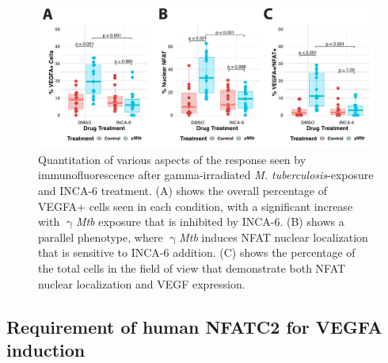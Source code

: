 \begin{figure}
\centering
\includegraphics[width=\textwidth]{images/incaIFquant.pdf}
\caption{Quantitation of various aspects of the response seen by immunofluorescence after gamma-irradiated \textit{M. tuberculosis}-exposure and INCA-6 treatment. (A) shows the overall percentage of VEGFA+ cells seen in each condition, with a significant increase with $\upgamma$\textit{Mtb} exposure that is inhibited by INCA-6. (B) shows a parallel phenotype, where $\upgamma$\textit{Mtb} induces NFAT nuclear localization that is sensitive to INCA-6 addition. (C) shows the percentage of the total cells in the field of view that demonstrate both NFAT nuclear localization and VEGF expression.}
\label{figure:incaquant}
\end{figure}

\subsection{Requirement of human NFATC2 for VEGFA induction}\label{thp1lenti}

